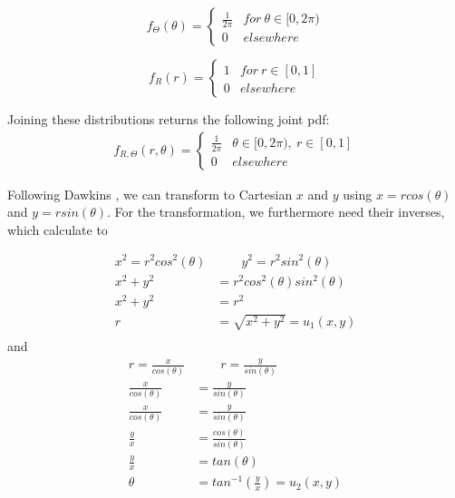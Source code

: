 \begin{equation}
f_\Theta(\theta) = 
\begin{cases} 
      \frac{1}{2\pi} & for~\theta \in [0,2\pi)\\
      0&elsewhere
   \end{cases}
\label{eq:theta_untransformed}
\end{equation}

\begin{equation}
f_R(r) = 
\begin{cases} 
      1 & for~r\in[0,1]\\
      0&elsewhere
   \end{cases}
\label{eq:r_untransformed}
\end{equation}

Joining these distributions returns the following joint pdf:
\begin{equation}
\begin{split}
f_{R,\Theta}(r,\theta) = 
\begin{cases} 
      \frac{1}{2\pi} & \theta \in [0,2\pi),~ r\in[0,1]\\
      0&elsewhere
   \end{cases}
\end{split}
\label{eq:joint_pdf_untransformed}
\end{equation}

Following Dawkins \cite{dawkins}, we can transform to Cartesian $x$ and $y$ using $x = rcos(\theta)$ and $y=rsin(\theta)$. For the transformation, we furthermore need their inverses, which calculate to 

\begin{align*}
x^2=r^2cos^2(\theta)& \qquad y^2=r^2sin^2(\theta)\\
x^2+y^2&=r^2cos^2(\theta)sin^2(\theta)\\
x^2+y^2&=r^2\\
r &= \sqrt{x^2+y^2} = u_1(x,y)\\
\label{eq:r-1}
\end{align*}
and
\begin{align*}
 r = \frac{x}{cos(\theta)}& \qquad r = \frac{y}{sin(\theta)}\\
 \frac{x}{cos(\theta)} &= \frac{y}{sin(\theta)}\\
 \frac{x}{cos(\theta)} &= \frac{y}{sin(\theta)}\\
 \frac{y}{x} &= \frac{cos(\theta)}{sin(\theta)}\\
 \frac{y}{x} &= tan(\theta)\\
 \theta &= tan^{-1}(\frac{y}{x}) = u_2(x,y)
\label{eq:theta-1}
\end{align*}

